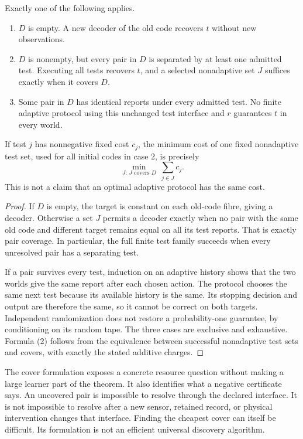 \begin{GAtheorem}\label{GA:thm:trichotomy}
Exactly one of the following applies.
\begin{enumerate}
\item $D$ is empty. A new decoder of the old code recovers $t$ without new observations.
\item $D$ is nonempty, but every pair in $D$ is separated by at least one admitted test. Executing all tests recovers $t$, and a selected nonadaptive set $J$ suffices exactly when it covers $D$.
\item Some pair in $D$ has identical reports under every admitted test. No finite adaptive protocol using this unchanged test interface and $r$ guarantees $t$ in every world.
\end{enumerate}
If test $j$ has nonnegative fixed cost $c_j$, the minimum cost of one fixed nonadaptive test set, used for all initial codes in case 2, is precisely
\[
\min_{J:\,J\text{ covers }D}\ \sum_{j\in J}c_j.\tag{2}
\]
This is not a claim that an optimal adaptive protocol has the same cost.
\end{GAtheorem}
\begin{proof}
If $D$ is empty, the target is constant on each old-code fibre, giving a decoder. Otherwise a set $J$ permits a decoder exactly when no pair with the same old code and different target remains equal on all its test reports. That is exactly pair coverage. In particular, the full finite test family succeeds when every unresolved pair has a separating test.

If a pair survives every test, induction on an adaptive history shows that the two worlds give the same report after each chosen action. The protocol chooses the same next test because its available history is the same. Its stopping decision and output are therefore the same, so it cannot be correct on both targets. Independent randomization does not restore a probability-one guarantee, by conditioning on its random tape. The three cases are exclusive and exhaustive. Formula (2) follows from the equivalence between successful nonadaptive test sets and covers, with exactly the stated additive charges.
\end{proof}

The cover formulation exposes a concrete resource question without making a large learner part of the theorem. It also identifies what a negative certificate says. An uncovered pair is impossible to resolve through the declared interface. It is not impossible to resolve after a new sensor, retained record, or physical intervention changes that interface. Finding the cheapest cover can itself be difficult. Its formulation is not an efficient universal discovery algorithm.

